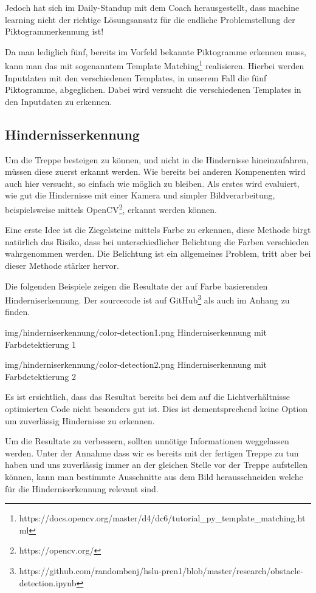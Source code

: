 Jedoch hat sich im Daily-Standup mit dem Coach herausgestellt, dass machine learning nicht der richtige Lösungsansatz für die endliche Problemstellung der Piktogrammerkennung ist! 

Da man lediglich fünf, bereits im Vorfeld bekannte Piktogramme erkennen muss, kann man das mit sogenanntem Template Matching\footnote{https://docs.opencv.org/master/d4/dc6/tutorial\_py\_template\_matching.html} realisieren. Hierbei werden Inputdaten mit den verschiedenen Templates, in unserem Fall die fünf Piktogramme, abgeglichen. Dabei wird versucht die verschiedenen Templates in den Inputdaten zu erkennen. 


\subsection{Hindernisserkennung}

Um die Treppe besteigen zu können, und nicht in die Hindernisse hineinzufahren, müssen
diese zuerst erkannt werden. Wie bereits bei anderen Kompenenten wird auch hier versucht, so einfach wie möglich zu bleiben.
Als erstes wird evaluiert, wie gut die Hindernisse mit einer Kamera
und simpler Bildverarbeitung, beispielsweise mittels OpenCV\footnote{https://opencv.org/}, erkannt werden
können.

Eine erste Idee ist die Ziegelsteine mittels Farbe zu erkennen, diese Methode
birgt natürlich das Risiko, dass bei unterschiedlicher Belichtung die 
Farben verschieden wahrgenommen werden. Die Belichtung ist ein allgemeines Problem,
tritt aber bei dieser Methode stärker hervor.

Die folgenden Beispiele zeigen die Resultate der auf Farbe basierenden 
Hinderniserkennung. Der sourcecode ist auf GitHub\footnote{https://github.com/randombenj/hslu-pren1/blob/master/research/obstacle-detection.ipynb} als auch im Anhang zu finden.

\image
  {img/hinderniserkennung/color-detection1.png}
  {Hinderniserkennung mit Farbdetektierung 1}

\image
  {img/hinderniserkennung/color-detection2.png}
  {Hinderniserkennung mit Farbdetektierung 2}

Es ist ersichtlich, dass das Resultat bereits bei dem auf die Lichtverhältnisse optimierten
Code nicht besonders gut ist. Dies ist dementsprechend keine Option um
zuverlässig Hindernisse zu erkennen.

Um die Resultate zu verbessern, sollten unnötige Informationen weggelassen werden.
Unter der Annahme dass wir es bereits mit der fertigen Treppe zu tun haben
und uns zuverlässig immer an der gleichen Stelle vor der Treppe
aufstellen können, kann man bestimmte Ausschnitte aus dem Bild herausschneiden
welche für die Hinderniserkennung relevant sind.
\newpage

